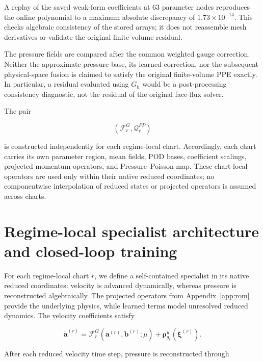 \documentclass{article}
\begin{document}
A replay of the saved weak-form coefficients at 63 parameter nodes reproduces the online polynomial to a maximum absolute discrepancy of $1.73\times10^{-14}$. This checks algebraic consistency of the stored arrays; it does not reassemble mesh derivatives or validate the original finite-volume residual.

The pressure fields are compared after the common weighted gauge correction. Neither the approximate pressure base, its learned correction, nor the subsequent physical-space fusion is claimed to satisfy the original finite-volume PPE exactly. In particular, a residual evaluated using $G_h$ would be a post-processing consistency diagnostic, not the residual of the original face-flux solver.

The pair


\begin{equation}
    \left(
        \mathcal F_r^G,
        \mathcal Q_r^{PP}
    \right)
\end{equation}


is constructed independently for each regime-local chart.
Accordingly, each chart carries its own parameter region, mean fields,
POD bases, coefficient scalings, projected momentum operators, and
Pressure--Poisson map.
These chart-local operators are used only within their native reduced
coordinates; no componentwise interpolation of reduced states or projected
operators is assumed across charts.


\section{Regime-local specialist architecture and closed-loop training}
\label{app:specialists}

For each regime-local chart $r$, we define a self-contained 
specialist in its native reduced coordinates: velocity is advanced
dynamically, whereas pressure is reconstructed algebraically.
The projected operators from Appendix~\ref{app:rom} provide the underlying physics, while learned terms model unresolved reduced dynamics. The velocity coefficients satisfy


\begin{equation}
  \dot{\bm a}^{(r)}
  =
  \mathcal F_r^G
  \left(
    \bm a^{(r)},\bm b^{(r)};\mu
  \right)
  +
  \bm\rho^u_{\theta_r}
  \left(
    \bm\xi^{(r)}
  \right).
  \label{eq:app_hybrid_velocity_rhs}
\end{equation}


After each reduced velocity time step, pressure is reconstructed through
\end{document}
